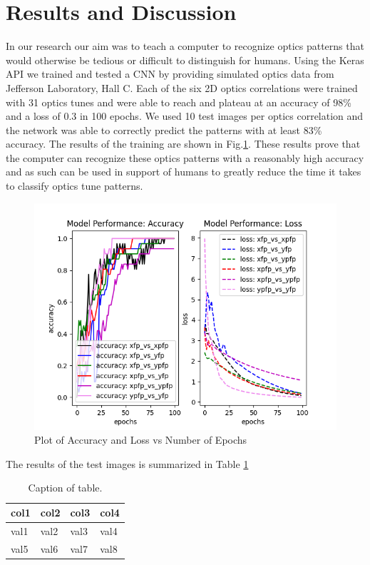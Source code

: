 \documentclass[conference]{IEEEtran}
\begin{document}
\section{Results and Discussion}

\indent In our research our aim was to teach a computer to recognize optics patterns that would otherwise be tedious or difficult to distinguish for humans. Using the Keras API we trained and tested a CNN by providing simulated optics data from Jefferson Laboratory, Hall C. Each of the six 2D optics correlations were trained with 31 optics tunes and were able to reach and plateau at an accuracy of 98\% and a loss of 0.3 in 100 epochs. We used 10 test images per optics correlation and the network was able to correctly predict the patterns with at least 83\% accuracy. The results of the training are shown in Fig.\ref{}. These results prove that the computer can recognize these optics patterns with a reasonably high accuracy and as such can be used in support of humans to greatly reduce the time it takes to classify optics tune patterns.



\begin{figure}
  \centering
  \includegraphics[scale=0.3]{images/Figure_1.png}
  \caption{Plot of Accuracy and Loss vs Number of Epochs}
\end{figure}



The results of the test images is summarized in Table \ref{tab:results}
\begin{table}[h]
	\begin{center}
		\begin{tabular}{llll} %
                  \hline
                  col1 & col2 & col3 & col4 \\ \hline \hline
	          val1 & val2 & val3 & val4 \\
                  val5 & val6 & val7 & val8 \\
		  \hline 
		\end{tabular}
	\end{center}
	\caption{Caption of table.}
	\label{tab:results}
\end{table}


   

\end{document}
